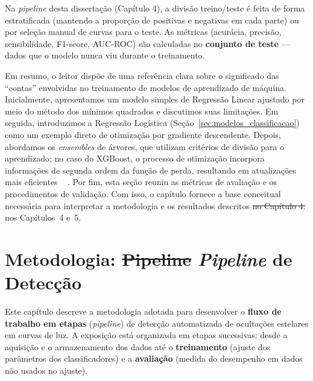 \documentclass[msc]{on} %
\makeatletter
\providecommand{\DIFaddtex}[1]{{\protect\color{red}#1}} %
\providecommand{\DIFdeltex}[1]{{\protect\color{red}\sout{#1}}} %
\providecommand{\DIFaddbegin}{} %
\providecommand{\DIFaddend}{} %
\providecommand{\DIFdelbegin}{} %
\providecommand{\DIFdelend}{} %
\providecommand{\DIFadd}[1]{\texorpdfstring{\DIFaddtex{#1}}{#1}} %
\providecommand{\DIFdel}[1]{\texorpdfstring{\DIFdeltex{#1}}{}} %
\let\sout@orig\sout %
\renewcommand{\sout}[1]{\ifmmode\text{\sout@orig{\ensuremath{#1}}}\else\sout@orig{#1}\fi} %
\makeatother
\begin{document}
Na \textit{pipeline} desta dissertação (Capítulo 4), a divisão treino/teste é feita de forma estratificada (mantendo a proporção de positivas e negativas em cada parte) ou por seleção manual de curvas para o teste. As métricas (acurácia, precisão, sensibilidade, F1-score, AUC-ROC) são calculadas no \textbf{conjunto de teste} --- dados que o modelo nunca viu durante o treinamento.
\DIFaddbegin 

\DIFadd{Em resumo, o leitor dispõe de uma referência clara sobre o significado das ``contas'' envolvidas no treinamento de modelos de aprendizado de máquina. Inicialmente, apresentamos um modelo simples de Regressão Linear ajustado por meio do método dos mínimos quadrados e discutimos suas limitações. Em seguida, introduzimos a Regressão Logística (Seção~\ref{sec:modelos_classificacao}) como um exemplo direto de otimização por gradiente descendente. Depois, abordamos os }\textit{\DIFadd{ensembles}} \DIFadd{de árvores, que utilizam critérios de divisão para o aprendizado; no caso do XGBoost, o processo de otimização incorpora informações de segunda ordem da função de perda, resultando em atualizações mais eficientes \mbox{%
\citep{geron2019maos}}\hskip0pt%
. Por fim, esta seção reuniu as métricas de avaliação e os procedimentos de validação. }\DIFaddend Com isso, o capítulo fornece a base conceitual necessária para interpretar a metodologia e os resultados descritos \DIFdelbegin \DIFdel{no Capítulo 4.
}\DIFdelend \DIFaddbegin \DIFadd{nos Capítulos~4 e~5.
}\DIFaddend 


\chapter{Metodologia: \DIFdelbegin \DIFdel{Pipeline }\DIFdelend \DIFaddbegin \texorpdfstring{\textit{Pipeline}}{Pipeline} \DIFaddend de Detecção}


Este capítulo descreve a metodologia adotada para desenvolver o \textbf{fluxo de trabalho em etapas} (\textit{pipeline}) de detecção automatizada de ocultações estelares em curvas de luz. A exposição está organizada em etapas sucessivas: desde a aquisição e o armazenamento dos dados até o \textbf{treinamento} (ajuste dos parâmetros dos classificadores) e a \textbf{avaliação} (medida do desempenho em dados não usados no ajuste). 
\end{document}

